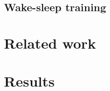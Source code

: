 \documentclass[12pt]{article}
\begin{document}
\subsection{Wake-sleep training}
\label{sec:wake_sleep}


\section{Related work}
\label{sec:related_work}


\section{Results}
\label{sec:results}





\end{document}
